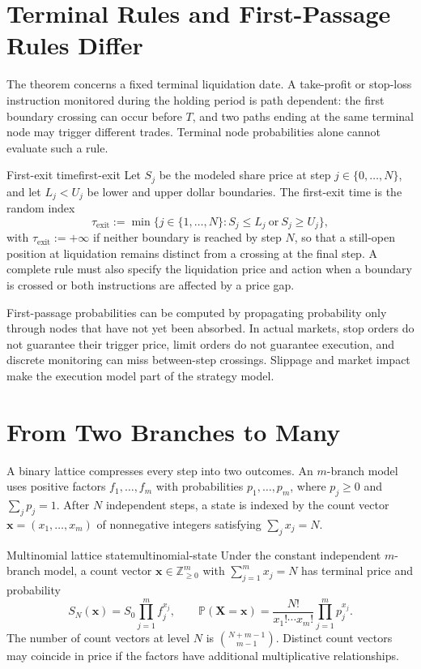 \documentclass[11pt]{article}
\newcommand{\Pmeasure}{\mathbb{P}}
\begin{document}
\section{Terminal Rules and First-Passage Rules Differ}

The theorem concerns a fixed terminal liquidation date. A take-profit or stop-loss instruction monitored during the holding period is path dependent: the first boundary crossing can occur before $T$, and two paths ending at the same terminal node may trigger different trades. Terminal node probabilities alone cannot evaluate such a rule.

\begin{definition}{First-exit time}{first-exit}
Let $S_j$ be the modeled share price at step $j\in\{0,\ldots,N\}$, and let $L_j<U_j$ be lower and upper dollar boundaries. The first-exit time is the random index
\begin{equation}
  \label{eq:first-exit}
  \tau_{\mathrm{exit}}:=
  \min\{j\in\{1,\ldots,N\}:S_j\leq L_j\ \text{or}\ S_j\geq U_j\},
\end{equation}
with $\tau_{\mathrm{exit}}:=+\infty$ if neither boundary is reached by step $N$, so that a still-open position at liquidation remains distinct from a crossing at the final step. A complete rule must also specify the liquidation price and action when a boundary is crossed or both instructions are affected by a price gap.
\end{definition}

First-passage probabilities can be computed by propagating probability only through nodes that have not yet been absorbed. In actual markets, stop orders do not guarantee their trigger price, limit orders do not guarantee execution, and discrete monitoring can miss between-step crossings. Slippage and market impact make the execution model part of the strategy model.

\section{From Two Branches to Many}

A binary lattice compresses every step into two outcomes. An $m$-branch model uses positive factors $f_1,\ldots,f_m$ with probabilities $p_1,\ldots,p_m$, where $p_j\geq0$ and $\sum_jp_j=1$. After $N$ independent steps, a state is indexed by the count vector $\mathbf{x}=(x_1,\ldots,x_m)$ of nonnegative integers satisfying $\sum_jx_j=N$.

\begin{proposition}{Multinomial lattice state}{multinomial-state}
Under the constant independent $m$-branch model, a count vector $\mathbf{x}\in\mathbb{Z}_{\geq0}^m$ with $\sum_{j=1}^{m}x_j=N$ has terminal price and probability
\begin{equation}
  \label{eq:multinomial-state}
  S_N(\mathbf{x})=S_0\prod_{j=1}^{m}f_j^{x_j},
  \qquad
  \Pmeasure(\mathbf{X}=\mathbf{x})
  =\frac{N!}{x_1!\cdots x_m!}\prod_{j=1}^{m}p_j^{x_j}.
\end{equation}
The number of count vectors at level $N$ is $\binom{N+m-1}{m-1}$. Distinct count vectors may coincide in price if the factors have additional multiplicative relationships.
\end{proposition}
\end{document}
